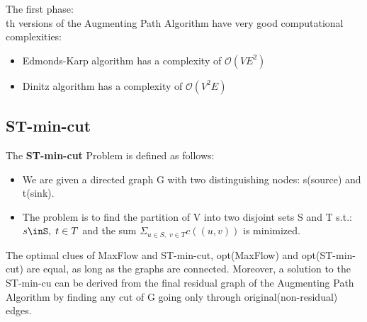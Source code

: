 The first phase:\\

%
%
%
%
%
%
th versions of the Augmenting Path Algorithm have very good computational complexities:
\begin{itemize}
        \item Edmonds-Karp algorithm has a complexity of $\mathcal{O}(VE^{2})$ 
        \item Dinitz algorithm has a complexity of $\mathcal{O}(V^{2}E)$
        
\end{itemize}


\subsection{ST-min-cut}

{
    The \textbf{ST-min-cut} Problem is defined as follows:
    \begin{itemize}
            \item We are given a directed graph G with two distinguishing nodes: s(source) and t(sink).
            \item The problem is to find the partition of V into two disjoint sets S and T s.t.: $s\inS,\; t\in T$ and the sum  $\Sigma_{u\in S,\;v\in T}c((u,v))$ is minimized.
    \end{itemize}
    
}
\thm{}
{
    The optimal clues of MaxFlow and ST-min-cut, opt(MaxFlow) and opt(ST-min-cut) are equal, as long as the graphs are connected. Moreover, a solution to the ST-min-cu can be derived from the final residual graph of the Augmenting Path Algorithm by finding any cut of G going only through original(non-residual) edges.
}

